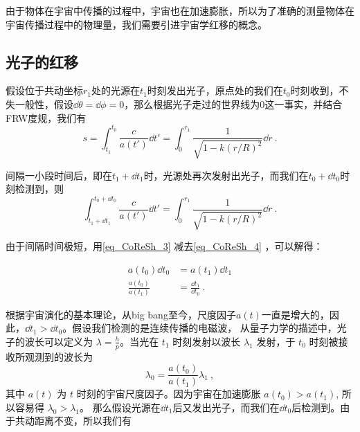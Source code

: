 \begin{issues}
\issueMissDepend
\end{issues}

由于物体在宇宙中传播的过程中，宇宙也在加速膨胀，所以为了准确的测量物体在宇宙传播过程中的物理量，我们需要引进宇宙学红移的概念。

\subsection{光子的红移}
假设位于共动坐标$r_1$处的光源在$t_1$时刻发出光子，原点处的我们在$t_0$时刻收到，不失一般性，假设$\dd\theta=\dd\phi=0$，那么根据光子走过的世界线为$0$这一事实，并结合FRW度规，我们有
\begin{equation}\label{eq_CoReSh_4}
s=\int^{t_0}_{t_1}\frac{c}{a(t')}\dd t'=\int_0^{r_1}\frac{1}{\sqrt{1-k(r/R)^2}}\dd r~.
\end{equation}

间隔一小段时间后，即在$t_1+\dd t_1$时，光源处再次发射出光子，而我们在$t_0+\dd t_0$时刻检测到，则
\begin{equation}\label{eq_CoReSh_3}
\int^{t_0+\dd t_0}_{t_1+\dd t_1}\frac{c}{a(t')}\dd t'=\int_0^{r_1}\frac{1}{\sqrt{1-k(r/R)^2}}\dd r~.
\end{equation}

由于间隔时间极短，用\autoref{eq_CoReSh_3} 减去\autoref{eq_CoReSh_4} ，可以解得：

\begin{equation}
\begin{aligned}
a(t_0)\dd t_0&=a(t_1)\dd t_1\\
\frac{a(t_0)}{a(t_1)}&=\frac{\dd t_1}{\dd t_0}~.
\end{aligned}
\end{equation}

根据宇宙演化的基本理论，从big bang至今，尺度因子$a(t)$一直是增大的，因此，$\dd t_1>\dd t_0$。假设我们检测的是连续传播的电磁波，
从量子力学的描述中，光子的波长可以定义为 $\lambda=\frac{h}{p}$。当光在 $t_1$ 时刻发射以波长 $\lambda_1$ 发射，于 $t_0$ 时刻被接收所观测到的波长为
\begin{equation}\label{eq_CoReSh_1}
\lambda_0=\frac{a(t_0)}{a(t_1)}\lambda_1~,
\end{equation}
其中 $a(t)$ 为 $t$ 时刻的宇宙尺度因子。因为宇宙在加速膨胀 $a(t_0)>a(t_1)$, 所以容易得 $\lambda_0>\lambda_1$。
那么假设光源在$\dd t_1$后又发出光子，而我们在$\dd t_0$后检测到。由于共动距离不变，所以我们有
